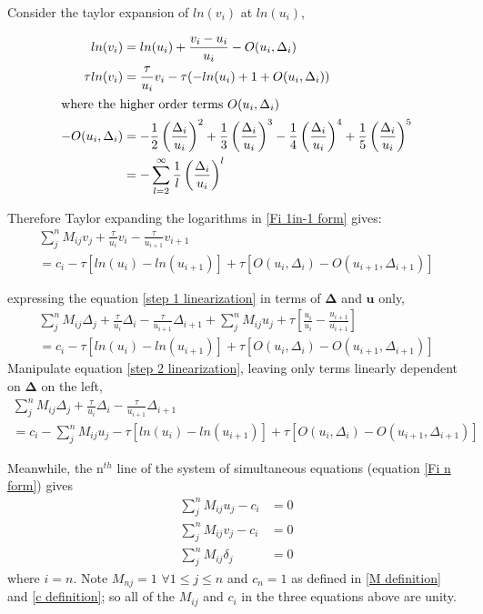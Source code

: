 \documentclass[a4paper, 12pt]{article}
\newcommand{\ve}[1]{\boldsymbol{#1}}
\begin{document}
Consider the taylor expansion of $ln(v_i)$ at $ln(u_i)$,

\begin{align}
    ln(v_i) &= ln(u_i) + \frac{v_i - u_i}{u_i} - O(u_i, \Delta_i) \\
\tau ln(v_i)&= \frac{\tau}{u_i}v_i - \tau(-ln(u_i) + 1 + O(u_i, \Delta_i))
\\
\intertext{where the higher order terms $O(u_i, \Delta_i)$ }
    - O(u_i,\Delta_i) &= - \frac{1}{2} \left(\frac{\Delta_i}{u_i}\right)^2 + \frac{1}{3} \left(\frac{\Delta_i}{u_i}\right)^3 - \frac{1}{4} \left(\frac{\Delta_i}{u_i}\right)^4 + \frac{1}{5} \left(\frac{\Delta_i}{u_i}\right)^5
    \\
    &= - \sum_{l=2}^{\infty} \frac{1}{l} \left(\frac{\Delta_i}{u_i}\right)^l
\end{align}

Therefore Taylor expanding the logarithms in \ref{Fi 1in-1 form} gives:
\begin{multline}
    \sum_j^n M_{ij}v_j + \frac{\tau}{u_i}v_i - \frac{\tau}{u_{i+1}}v_{i+1}\\
    = c_i - \tau [ln(u_i)-ln(u_{i+1})] + \tau [O(u_i,\Delta_i) - O(u_{i+1}, \Delta_{i+1})]
    \label{step 1 linearization}
\end{multline}

expressing the equation \ref{step 1 linearization} in terms of $\ve{\Delta}$ and $\ve{u}$ only,
\begin{multline}
    \sum_j^n M_{ij}\Delta_j + \frac{\tau}{u_i}\Delta_i - \frac{\tau}{u_{i+1}}\Delta_{i+1}
    + \sum_j^n M_{ij} u_j + \tau [\frac{u_i}{u_i} - \frac{u_{i+1}}{u_{i+1}}]
    \\
    = c_i - \tau [ln(u_i)-ln(u_{i+1})] + \tau [O(u_i,\Delta_i) - O(u_{i+1}, \Delta_{i+1})]
    \label{step 2 linearization}
\end{multline}
Manipulate equation \ref{step 2 linearization}, leaving only terms linearly dependent on $\ve{\Delta}$ on the left,
\begin{multline}
    \sum_j^n M_{ij}\Delta_j + \frac{\tau}{u_i}\Delta_i - \frac{\tau}{u_{i+1}}\Delta_{i+1}
    \\
    = c_i - \sum_j^n M_{ij} u_j - \tau [ln(u_i)-ln(u_{i+1})] + \tau [O(u_i,\Delta_i) - O(u_{i+1}, \Delta_{i+1})]
    \label{double diag expanded u-v separated}
\end{multline}

Meanwhile, the n${}^{th}$ line of the system of simultaneous equations (equation \ref{Fi n form}) gives
\begin{align}
    \sum_j^n M_{ij} u_j - c_i &= 0 \\
    \sum_j^n M_{ij} v_j - c_i &= 0 \\
    \sum_j^n M_{ij} \delta_j  &= 0
\end{align}
where $i=n$. Note $M_{nj} = 1$ $\forall 1\le j\le n$ and $c_n =1$ as defined in \ref{M definition} and \ref{c definition}; so all of the $M_{ij}$ and $c_i$ in the three equations above are unity.
\end{document}
